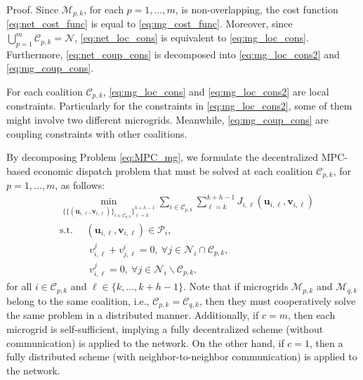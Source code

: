 \begin{pf*}{Proof.}
	Since $\mathcal{M}_{p,k}$, for each $p=1,\dots,m$, is non-overlapping, the cost function \eqref{eq:net_cost_func} is equal to  \eqref{eq:mg_cost_func}. Moreover, since $\bigcup_{p=1}^m \mathcal{C}_{p,k} = \mathcal{N}$,  \eqref{eq:net_loc_cons} is equivalent to \eqref{eq:mg_loc_cons}. Furthermore, \eqref{eq:net_coup_cons} is decomposed into \eqref{eq:mg_loc_cons2} and \eqref{eq:mg_coup_cons}.  \eod
\end{pf*}
\begin{rem}
	\label{rem:const_coal}
	For each coalition $\mathcal{C}_{p,k}$, \eqref{eq:mg_loc_cons} and \eqref{eq:mg_loc_cons2} are local constraints. Particularly for the constraints in \eqref{eq:mg_loc_cons2}, some of them might involve two different microgrids. Meanwhile, \eqref{eq:mg_coup_cons} are coupling constraints with other coalitions. \eod
\end{rem}
By decomposing Problem \eqref{eq:MPC_mg}, we formulate the decentralized MPC-based economic dispatch problem that must be solved at each coalition $\mathcal{C}_{p,k}$, for $p=1,\dots,m$, as follows:
\begin{subequations}
	\begin{align}
	&\min_{\{\{(\bm{u}_{i,\ell},\bm{v}_{i,\ell})\}_{i \in \mathcal{C}_{p,k}}\}_{\ell=k}^{k+h-1}} \sum_{i \in \mathcal{C}_{p,k}} \sum_{\ell =k}^{k+h-1}  J_{i,\ell}(\bm{u}_{i,\ell},\bm{v}_{i,\ell})\\
	&\text{s.t. } \quad  (\bm{u}_{i,\ell},\bm{v}_{i,\ell}) \in \mathcal{P}_i,   \label{eq:co_loc_cons}\\
		&\qquad \quad v_{i,\ell}^j + v_{j,\ell}^i = 0, \ \forall j \in \mathcal{N}_i\cap\mathcal{C}_{p,k},   \label{eq:co_loc_cons2}\\
		&\qquad \quad v_{i,\ell}^j = 0, \ \forall j \in \mathcal{N}_i\backslash\mathcal{C}_{p,k},  \label{eq:coup_dec_const}
	\end{align}
	\label{eq:lo_mpc}%
\end{subequations}
for all $i \in \mathcal{C}_{p,k}$ and $\ell \in\{k,\dots, k+h-1 \}$. Note that if microgrids $\mathcal{M}_{p,k}$ and $\mathcal{M}_{q,k}$ belong to the same coalition, i.e., $\mathcal{C}_{p,k}=\mathcal{C}_{q,k}$,  then they must cooperatively solve the same problem in a distributed manner. Additionally, if $c=m$, then each microgrid is self-sufficient, implying a fully decentralized scheme (without communication) is applied to the network. On the other hand, if $c=1$, then a fully distributed scheme (with neighbor-to-neighbor communication) is applied to the network.

